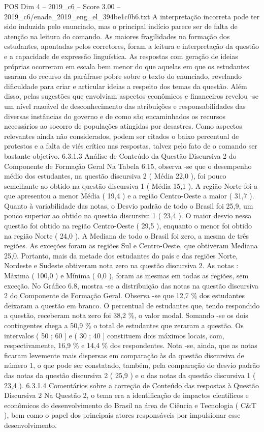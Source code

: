 \begin{textsample}{POS Dim 4 – 2019\_c6 – Score 3.00 – 2019\_c6/enade\_2019\_eng\_el\_394be1c0b6.txt}
A interpretação incorreta pode ter sido induzida pelo enunciado, mas o principal indício parece ser de falta de atenção na leitura do comando.
As maiores fragilidades na formação dos estudantes, apontadas pelos corretores, foram a leitura e interpretação da questão e a capacidade de expressão linguística.
As respostas com geração de ideias próprias ocorreram em escala bem menor do que aquelas em que os estudantes usaram do recurso da paráfrase pobre sobre o texto do enunciado, revelando dificuldade para criar e articular ideias a respeito dos temas da questão.
Além disso, pelas sugestões que envolviam aspectos econômicos e financeiros revelou -se um nível razoável de desconhecimento das atribuições e responsabilidades das diversas instâncias do governo e de como são encaminhados os recursos necessários ao socorro de populações atingidas por desastres.
Como aspectos relevantes ainda não considerados, podem ser citados o baixo percentual de protestos e a falta de viés crítico nas respostas, talvez pelo fato de o comando ser bastante objetivo. 6.3.1.3 Análise de Conteúdo da Questão Discursiva 2 do Componente de Formação Geral Na Tabela 6.15, observa -se que o desempenho médio dos estudantes, na questão discursiva 2 ( Média 22,0 ), foi pouco semelhante ao obtido na questão discursiva 1 ( Média 15,1 ).
A região Norte foi a que apresentou a menor Média ( 19,4 ) e a região Centro-Oeste a maior ( 31,7 ).
Quanto à variabilidade das notas, o Desvio padrão de todo o Brasil foi 25,9, um pouco superior ao obtido na questão discursiva 1 ( 23,4 ).
O maior desvio nessa questão foi obtido na região Centro-Oeste ( 29,5 ), enquanto o menor foi obtido na região Norte ( 24,0 ).
A Mediana de todo o Brasil foi zero, a mesma de três regiões.
As exceções foram as regiões Sul e Centro-Oeste, que obtiveram Mediana 25,0.
Portanto, mais da metade dos estudantes do país e das regiões Norte, Nordeste e Sudeste obtiveram nota zero na questão discursiva 2.
As notas : Máxima ( 100,0 ) e Mínima ( 0,0 ), foram as mesmas em todas as regiões, sem exceção.
No Gráfico 6.8, mostra -se a distribuição das notas na questão discursiva 2 do Componente de Formação Geral.
Observa -se que 12,7 \% dos estudantes deixaram a questão em branco.
O percentual de estudantes que, tendo respondido a questão, receberam nota zero foi 38,2 \%, o valor modal.
Somando -se os dois contingentes chega a 50,9 \% o total de estudantes que zeraram a questão.
Os intervalos ( 50 ; 60 ] e ( 30 ; 40 ] constituem dois máximos locais, com, respectivamente, 16,9 \% e 14,4 \% dos respondentes.
Nota -se, ainda, que as notas ficaram levemente mais dispersas em comparação às da questão discursiva de número 1, o que pode ser constatado, também, pela comparação do desvio padrão das notas da questão discursiva 2 ( 25,9 ) e o das notas da questão discursiva 1 ( 23,4 ). 6.3.1.4 Comentários sobre a correção de Conteúdo das respostas à Questão Discursiva 2 Na Questão 2, o tema era a identificação de impactos científicos e econômicos do desenvolvimento do Brasil na área de Ciência e Tecnologia ( C\&T ), bem como o papel dos principais atores responsáveis por impulsionar esse desenvolvimento.

\end{textsample}
